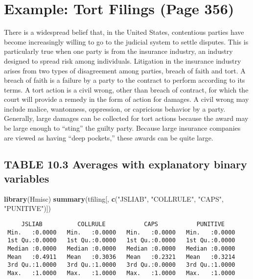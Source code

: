 \documentclass[]{book}
\newenvironment{Shaded}{\begin{snugshade}}{\end{snugshade}}
\newcommand{\KeywordTok}[1]{\textcolor[rgb]{0.13,0.29,0.53}{\textbf{#1}}}
\newcommand{\NormalTok}[1]{#1}
\newcommand{\StringTok}[1]{\textcolor[rgb]{0.31,0.60,0.02}{#1}}
\begin{document}
\hypertarget{example-tort-filings-page-356}{%
\section{Example: Tort Filings (Page 356)}\label{example-tort-filings-page-356}}

There is a widespread belief that, in the United States, contentious parties have become increasingly willing to go to the judicial system to settle disputes. This is particularly true when one party is from the insurance industry, an industry designed to spread risk among individuals. Litigation in the insurance industry arises from two types of disagreement among parties, breach of faith and tort. A breach of faith is a failure by a party to the contract to perform according to its terms. A tort action is a civil wrong, other than breach of contract, for which the court will provide a remedy in the form of action for damages. A civil wrong may include malice, wantonness, oppression, or capricious behavior by a party. Generally, large damages can be collected for tort actions because the award may be large enough to ``sting'' the guilty party. Because large insurance companies are viewed as having ``deep pockets,'' these awards can be quite large.

\hypertarget{table-10.3-averages-with-explanatory-binary-variables}{%
\subsection{TABLE 10.3 Averages with explanatory binary variables}\label{table-10.3-averages-with-explanatory-binary-variables}}

\begin{Shaded}
\begin{Highlighting}[]
\KeywordTok{library}\NormalTok{(Hmisc)}
\KeywordTok{summary}\NormalTok{(tfiling[, }\KeywordTok{c}\NormalTok{(}\StringTok{"JSLIAB"}\NormalTok{, }\StringTok{"COLLRULE"}\NormalTok{, }\StringTok{"CAPS"}\NormalTok{, }\StringTok{"PUNITIVE"}\NormalTok{)])}
\end{Highlighting}
\end{Shaded}

\begin{verbatim}
     JSLIAB          COLLRULE           CAPS           PUNITIVE     
 Min.   :0.0000   Min.   :0.0000   Min.   :0.0000   Min.   :0.0000  
 1st Qu.:0.0000   1st Qu.:0.0000   1st Qu.:0.0000   1st Qu.:0.0000  
 Median :0.0000   Median :0.0000   Median :0.0000   Median :0.0000  
 Mean   :0.4911   Mean   :0.3036   Mean   :0.2321   Mean   :0.3214  
 3rd Qu.:1.0000   3rd Qu.:1.0000   3rd Qu.:0.0000   3rd Qu.:1.0000  
 Max.   :1.0000   Max.   :1.0000   Max.   :1.0000   Max.   :1.0000  
\end{verbatim}
\end{document}

